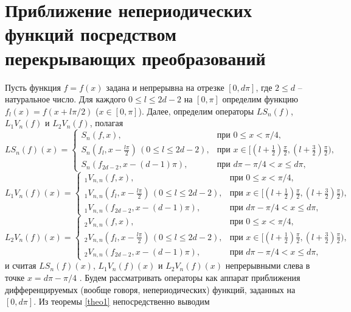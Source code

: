\section{Приближение непериодических функций посредством перекрывающих преобразований }\label{s4}
Пусть функция $f=f(x)$ задана и непрерывна на отрезке $[0,d\pi]$, где $2\le d$ -- натуральное число. Для каждого $0\le l\le 2d-2$ на $[0,\pi]$ определим функцию $f_l(x)=f(x+l\pi/2)$ ($x\in[0,\pi]$). Далее, определим  операторы $LS_n(f)$, $L_1V_n(f)$ и $L_2V_n(f)$, полагая
\begin{equation}\label{4.1}
LS_n(f)(x)=\begin{cases}S_n(f,x),&\text{при $0\le x<\pi/4$,}\\
                        S_n(f_{l},x-\frac{l\pi}{2})\, (0\le l\le 2d-2),&\text{при $x\in[(l+\frac12)\frac\pi2,(l+\frac32)\frac\pi2)$,}\\
                        S_n(f_{2d-2},x-(d-1)\pi),&\text{при $d\pi-\pi/4< x\le d\pi$,}
           \end{cases}
\end{equation}
\begin{equation}\label{4.2}
L_1V_n(f)(x)=\begin{cases}_1V_{n,n}(f,x),&\text{при $0\le x<\pi/4$,}\\
                        _1V_{n,n}(f_{l},x-\frac{l\pi}{2})\, (0\le l\le 2d-2),&\text{при $x\in[(l+\frac12)\frac\pi2,(l+\frac32)\frac\pi2)$,}\\
                        _1V_{n,n}(f_{2d-2},x-(d-1)\pi),&\text{при $d\pi-\pi/4< x\le d\pi$,}
           \end{cases}
\end{equation}
\begin{equation}\label{4.3}
L_2V_n(f)(x)=\begin{cases}_2V_{n,n}(f,x),&\text{при $0\le x<\pi/4$,}\\
                        _2V_{n,n}(f_{l},x-\frac{l\pi}{2})\, (0\le l\le 2d-2),&\text{при $x\in[(l+\frac12)\frac\pi2,(l+\frac32)\frac\pi2)$, }\\
                        _2V_{n,n}(f_{2d-2},x-(d-1)\pi),&\text{при $d\pi-\pi/4< x\le d\pi$,}
           \end{cases}
\end{equation}
и считая $LS_n(f)(x)$, $L_1V_n(f)(x)$ и $L_2V_n(f)(x)$ непрерывными слева в точке $x=d\pi-\pi/4$ . Будем рассматривать операторы как аппарат приближения дифференцируемых (вообще говоря, непериодических) функций, заданных на $[0,d\pi]$.  Из теоремы \ref{theo1} непосредственно выводим
